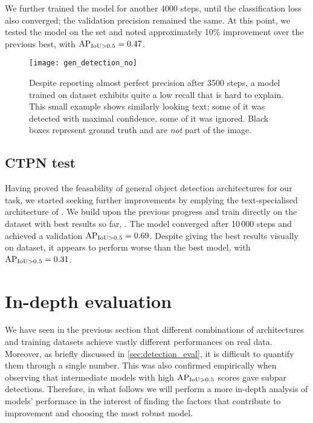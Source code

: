 			We further trained the model for another 4000 steps, until the classification loss also converged; the validation precision remained the same. At this point, we tested the model on the  set and noted approximately 10\% improvement over the previous best, with \(\operatorname{\operatorname{AP}_{\operatorname{IoU} > 0.5}} = 0.47\).

			\begin{figure}
				{
					\caption[ detection]{Despite reporting almost perfect precision after 3500 steps, a \FRCNN{} model trained on  dataset exhibits quite a low recall that is hard to explain. This small example shows similarly looking text; some of it was detected with maximal confidence, some of it was ignored. Black boxes represent ground truth and are \emph{not} part of the image. }
					\label{fig:gen_detection}
				}
				{\texttt{[image: gen\_detection\_no]}}
			\end{figure}

	\subsection{CTPN test}
		Having proved the feasability of general object detection architectures for our task, we started seeking further improvements by emplying the text-specialised architecture of \CTPN{}. We build upon the previous progress and train directly on the dataset with best results so far, . The model converged after 10\,000 steps and achieved a validation \(\operatorname{\operatorname{AP}_{\operatorname{IoU} > 0.5}} = 0.69\). Despite giving the best results visually on  dataset, it appears to perform worse than the best \FRCNN{} model, with \(\operatorname{\operatorname{AP}_{\operatorname{IoU} > 0.5}} = 0.31\).




\section{In-depth evaluation}\label{sec:detection_results}

	We have seen in the previous section that different combinations of architectures and training datasets achieve vastly different performances on real data. Moreover, as briefly discussed in \autoref{sec:detection_eval}, it is difficult to quantify them through a single number. This was also confirmed empirically when observing that intermediate models with high \(\operatorname{\operatorname{AP}_{\operatorname{IoU} > 0.5}}\) scores gave subpar detections. Therefore, in what follows we will perform a more in-depth analysis of models' performace in the interest of finding the factors that contribute to improvement and choosing the most robust model.

